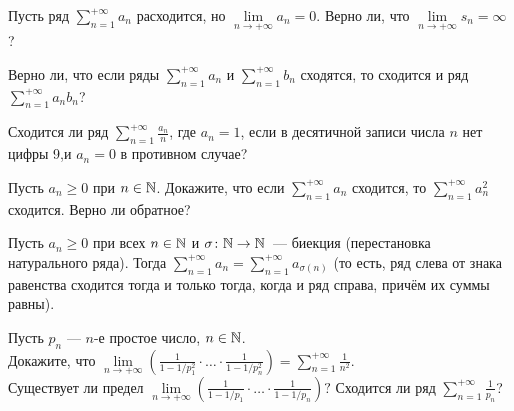 \documentclass[a4paper, 12pt]{article}
\begin{document}

Пусть ряд $\sum\limits_{n=1}^{+\infty} a_n$ расходится, но
$\lim\limits_{n\to{+\infty}}a_n=0$. Верно ли, что
$\lim\limits_{n\to{+\infty}} s_n={\infty}$?

Верно ли, что если ряды
$\sum\limits_{n=1}^{+\infty} a_n$ и $\sum\limits_{n=1}^{+\infty} b_n$
сходятся, то сходится и ряд $\sum\limits_{n=1}^{+\infty} a_nb_n$?



Сходится ли ряд $\sum\limits_{n=1}^{+\infty} \frac{a_n}{n}$, где
$a_n=1$, если в десятичной записи числа
$n$ нет цифры 9,\break и $a_n=0$ в противном случае?

Пусть $a_n\geq0$  при $n\in\mathbb{N}$.
 Докажите, что
если %
$\sum\limits_{n=1}^{+\infty} a_n$
сходится, то
$\sum\limits_{n=1}^{+\infty} a_n^2$ %
сходится.
 Верно ли обратное?


Пусть $a_n\geqslant0$ при всех $n\in\mathbb{N}$ и $\sigma\colon\mathbb{N}\rightarrow\mathbb{N}$~---
биекция (перестановка натурального ряда). Тогда $\sum\limits_{n=1}^{+\infty}a_n=
\sum\limits_{n=1}^{+\infty}a_{\sigma(n)}$ (то есть,
ряд слева от знака равенства сходится тогда и только тогда, когда и ряд справа, причём их суммы равны).


Пусть $p_n$ --- $n$-е простое число, $n\in\mathbb{N}$.\\
Докажите, что
$\lim\limits_{n\rightarrow{+\infty}}
\left(\frac1{1-1/p_1^2}\cdot\ldots\cdot\frac1{1-1/p_n^2}\right)=
\sum\limits_{n=1}^{+\infty} \frac1{n^2}$.\\
 Существует ли предел
$\lim\limits_{n\rightarrow{+\infty}}
\left(\frac1{1-1/p_1}\cdot\ldots\cdot\frac1{1-1/p_n}\right)?$
 Сходится ли ряд
$\sum\limits_{n=1}^{+\infty} \frac1{p_n}$?
\end{document}
